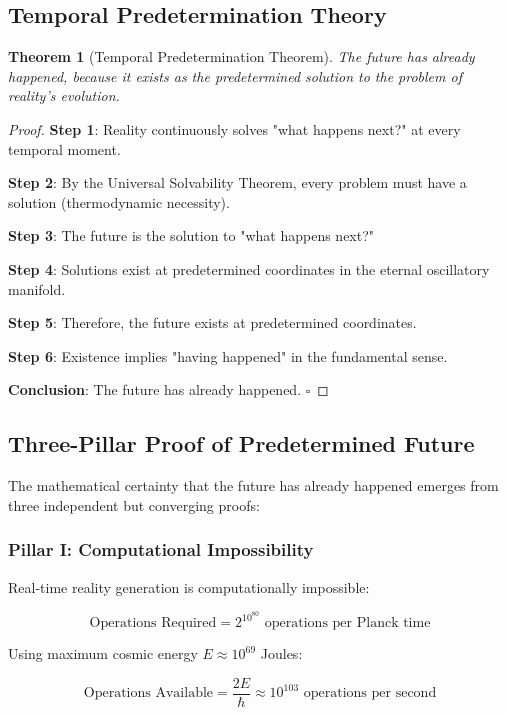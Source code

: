 \documentclass[12pt,a4paper]{article}
\newtheorem{theorem}{Theorem}[section]
\theoremstyle{remark}
\begin{document}
\subsection{Temporal Predetermination Theory}

\begin{theorem}[Temporal Predetermination Theorem]
The future has already happened, because it exists as the predetermined solution to the problem of reality's evolution.
\end{theorem}

\begin{proof}
\textbf{Step 1}: Reality continuously solves "what happens next?" at every temporal moment.

\textbf{Step 2}: By the Universal Solvability Theorem, every problem must have a solution (thermodynamic necessity).

\textbf{Step 3}: The future is the solution to "what happens next?"

\textbf{Step 4}: Solutions exist at predetermined coordinates in the eternal oscillatory manifold.

\textbf{Step 5}: Therefore, the future exists at predetermined coordinates.

\textbf{Step 6}: Existence implies "having happened" in the fundamental sense.

\textbf{Conclusion}: The future has already happened. $\square$
\end{proof}

\subsection{Three-Pillar Proof of Predetermined Future}

The mathematical certainty that the future has already happened emerges from three independent but converging proofs:

\subsubsection{Pillar I: Computational Impossibility}

Real-time reality generation is computationally impossible:

$$\text{Operations Required} = 2^{10^{80}} \text{ operations per Planck time}$$

Using maximum cosmic energy $E \approx 10^{69}$ Joules:

$$\text{Operations Available} = \frac{2E}{\hbar} \approx 10^{103} \text{ operations per second}$$
\end{document}
